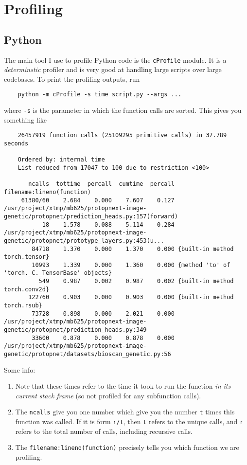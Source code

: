 \section{Profiling} 

\subsection{Python}  

  The main tool I use to profile Python code is the \texttt{cProfile} module. It is a \textit{determinstic} profiler and is very good at handling large scripts over large codebases. To print the profiling outputs, run 
  \begin{lstlisting}
    python -m cProfile -s time script.py --args ... 
  \end{lstlisting}
  where \texttt{-s} is the parameter in which the function calls are sorted. This gives you something like 
  
  \begin{lstlisting}
    26457919 function calls (25109295 primitive calls) in 37.789 seconds

    Ordered by: internal time
    List reduced from 17047 to 100 due to restriction <100>

       ncalls  tottime  percall  cumtime  percall filename:lineno(function)
     61380/60    2.684    0.000    7.607    0.127 /usr/project/xtmp/mb625/protopnext-image-genetic/protopnet/prediction_heads.py:157(forward)
           18    1.578    0.088    5.114    0.284 /usr/project/xtmp/mb625/protopnext-image-genetic/protopnet/prototype_layers.py:453(u...
        84718    1.370    0.000    1.370    0.000 {built-in method torch.tensor}
        10993    1.339    0.000    1.360    0.000 {method 'to' of 'torch._C._TensorBase' objects}
          549    0.987    0.002    0.987    0.002 {built-in method torch.conv2d}
       122760    0.903    0.000    0.903    0.000 {built-in method torch.rsub}
        73728    0.898    0.000    2.021    0.000 /usr/project/xtmp/mb625/protopnext-image-genetic/protopnet/prediction_heads.py:349
        33600    0.878    0.000    0.878    0.000 /usr/project/xtmp/mb625/protopnext-image-genetic/protopnet/datasets/bioscan_genetic.py:56
  \end{lstlisting}  
  Some info: 
  \begin{enumerate}
    \item Note that these times refer to the time it took to run the function \textit{in its current stack frame} (so not profiled for any subfunction calls). 
    \item The \texttt{ncalls} give you one number which give you the number \texttt{t} times this function was called. If it is form \texttt{r/t}, then \texttt{t} refers to the unique calls, and \texttt{r} refers to the total number of calls, including recursive calls.  
    \item The \texttt{filename:lineno(function)} precisely tells you which function we are profiling.  
  \end{enumerate}


